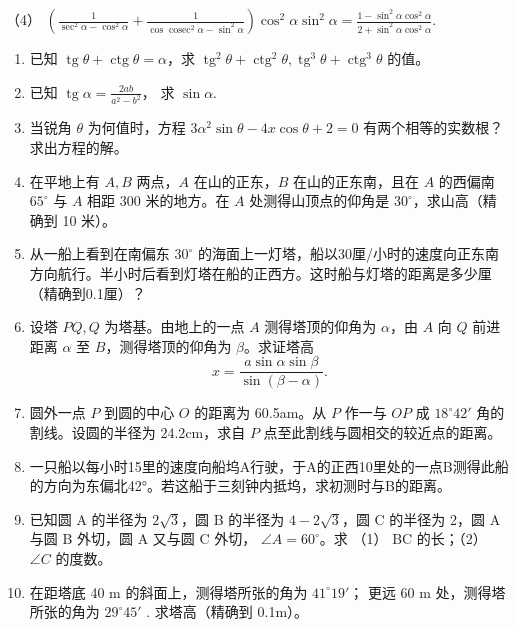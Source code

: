 （4）
\(\left(\frac{1}{\sec^2\alpha - \cos^2\alpha} + \frac{1}{\cos \operatorname{cosec}^2\alpha - \sin^2\alpha}\right) \cos^2\alpha \sin^2\alpha = \frac{1 - \sin^2\alpha \cos^2\alpha}{2 + \sin^2\alpha \cos^2\alpha}\).

\begin{enumerate}[start=12]
\item
  已知
  \(\operatorname{tg} \theta + \operatorname{ctg} \theta = \alpha\)，求
  \(\operatorname{tg}^2 \theta + \operatorname{ctg}^2 \theta, \operatorname{tg}^3 \theta + \operatorname{ctg}^3 \theta\)
  的值。
\item
  已知 \(\operatorname{tg} \alpha = \frac{2ab}{a^2 - b^2}\)， 求
  \(\sin \alpha\).
\item
  当锐角 \(\theta\) 为何值时，方程
  \(3\alpha^2\sin \theta - 4x\cos \theta + 2 = 0\)
  有两个相等的实数根？求出方程的解。
\item
  在平地上有 \(A, B\) 两点，\(A\) 在山的正东，\(B\) 在山的正东南，且在
  \(A\) 的西偏南 \(65^{\circ}\) 与 \(A\) 相距 300 米的地方。在 \(A\)
  处测得山顶点的仰角是 \(30^{\circ}\)，求山高（精确到 10 米）。
\item
  从一船上看到在南偏东 \(30^{\circ}\)
  的海面上一灯塔，船以30厘/小时的速度向正东南方向航行。半小时后看到灯塔在船的正西方。这时船与灯塔的距离是多少厘（精确到0.1厘）？
\item
  设塔 \(PQ, Q\) 为塔基。由地上的一点 \(A\) 测得塔顶的仰角为
  \(\alpha\)，由 \(A\) 向 \(Q\) 前进距离 \(\alpha\) 至
  \(B\)，测得塔顶的仰角为 \(\beta\)。求证塔高
\[
x = \frac {a \sin \alpha \sin \beta}{\sin (\beta - \alpha)}.
\]
\item
  圆外一点 \(P\) 到圆的中心 \(O\) 的距离为 60.5am。从 \(P\) 作一与
  \(OP\) 成 \(18^{\circ}42'\) 角的割线。设圆的半径为
  \(24.2\mathrm{cm}\)，求自 \(P\) 点至此割线与圆相交的较近点的距离。
\item
  一只船以每小时15里的速度向船坞A行驶，于A的正西10里处的一点B测得此船的方向为东偏北42°。若这船于三刻钟内抵坞，求初测时与B的距离。
\item
  已知圆 A 的半径为 \(2\sqrt{3}\)，圆 B 的半径为 \(4-2\sqrt{3}\)，圆 C
  的半径为 2，圆 A 与圆 B 外切，圆 A 又与圆 C 外切，
  \(\angle A=60^{\circ}\)。求 （1） BC 的长；（2） \(\angle C\) 的度数。
\item
  在距塔底 40 m 的斜面上，测得塔所张的角为 \(41^{\circ}19'\)； 更远 60 m
  处，测得塔所张的角为 \(29^{\circ}45'\) . 求塔高（精确到 0.1m）。
\end{enumerate}

